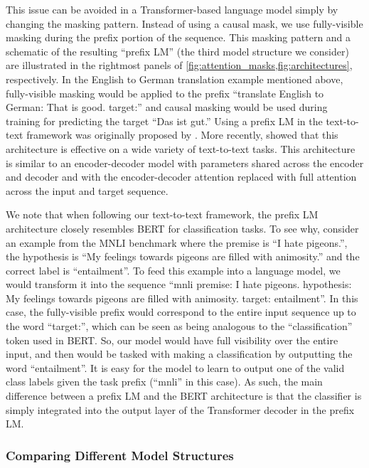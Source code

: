 \documentclass[twoside,11pt]{article}
\begin{document}
This issue can be avoided in a Transformer-based language model simply by changing the masking pattern.
Instead of using a causal mask, we use fully-visible masking during the prefix portion of the sequence.
This masking pattern and a schematic of the resulting ``prefix LM'' (the third model structure we consider) are illustrated in the rightmost panels of \cref{fig:attention_masks,fig:architectures}, respectively.
In the English to German translation example mentioned above, fully-visible masking would be applied to the prefix ``translate English to German: That is good. target:'' and causal masking would be used during training for predicting the target ``Das ist gut.''
Using a prefix LM in the text-to-text framework was originally proposed by \cite{liu2018generating}.
More recently, \cite{dong2019unified} showed that this architecture is effective on a wide variety of text-to-text tasks.
This architecture is similar to an encoder-decoder model with parameters shared across the encoder and decoder and with the encoder-decoder attention replaced with full attention across the input and target sequence.

We note that when following our text-to-text framework, the prefix LM architecture closely resembles BERT \citep{devlin2018bert} for classification tasks.
To see why, consider an example from the MNLI benchmark where the premise is ``I hate pigeons.'', the hypothesis is ``My feelings towards pigeons are filled with animosity.'' and the correct label is ``entailment''.
To feed this example into a language model, we would transform it into the sequence ``mnli premise: I hate pigeons. hypothesis: My feelings towards pigeons are filled with animosity. target: entailment''.
In this case, the fully-visible prefix would correspond to the entire input sequence up to the word ``target:'', which can be seen as being analogous to the ``classification'' token used in BERT.
So, our model would have full visibility over the entire input, and then would be tasked with making a classification by outputting the word ``entailment''.
It is easy for the model to learn to output one of the valid class labels given the task prefix (``mnli'' in this case).
As such, the main difference between a prefix LM and the BERT architecture is that the classifier is simply integrated into the output layer of the Transformer decoder in the prefix LM.

\subsubsection{Comparing Different Model Structures}
\label{sec:architecture_variants}
\end{document}
